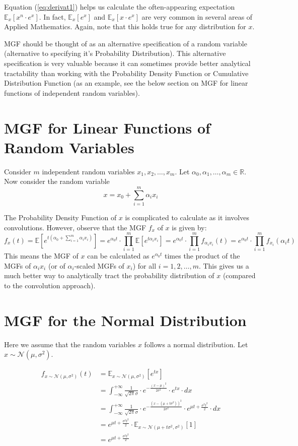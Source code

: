 \documentclass[10pt]{amsart}
\begin{document}
Equation (\ref{eq:derivat1}) helps us calculate the often-appearing expectation $\mathbb{E}_x[x^n \cdot e^x]$. In fact, $\mathbb{E}_x[e^x]$ and $\mathbb{E}_x[x \cdot e^x]$ are very common in several areas of Applied Mathematics. Again, note that this holds true for any distribution for $x$.

MGF should be thought of as an alternative specification of a random variable (alternative to specifying it's Probability Distribution). This alternative specification is very valuable because it can sometimes provide better analytical tractability than working with the Probability Density Function or Cumulative Distribution Function (as an example, see the below section on MGF for linear functions of independent random variables).

\section{MGF for Linear Functions of Random Variables}
Consider $m$ independent random variables $x_1, x_2, \ldots, x_m$. Let $\alpha_0, \alpha_1, \ldots, \alpha_m \in \mathbb{R}$. Now consider the random variable
$$x = x_0 + \sum_{i=1}^m \alpha_i x_i$$

The Probability Density Function of $x$ is complicated to calculate as it involves convolutions. However, observe that the MGF $f_x$ of $x$ is given by:
\begin{equation}
f_x(t) = \mathbb{E}[e^{t(\alpha_0 + \sum_{i=1}^m \alpha_i x_i)}] = e^{\alpha_0 t} \cdot \prod_{i=1}^m \mathbb{E}[e^{t\alpha_i x_i}] = e^{\alpha_0 t}  \cdot \prod_{i=1}^m f_{\alpha_i x_i}(t) = e^{\alpha_0 t}  \cdot \prod_{i=1}^m f_{x_i}(\alpha_i t)
\end{equation}
This means the MGF of $x$ can be calculated as $e^{\alpha_0 t}$ times the product of the MGFs of $\alpha_i x_i$ (or of $\alpha_i$-scaled MGFs of $x_i$) for all $i = 1, 2, \ldots, m$. This gives us a much better way to analytically tract the probability distribution of $x$ (compared to the convolution approach).


\section{MGF for the Normal Distribution}
Here we assume that the random variables $x$ follows a normal distribution. Let $x \sim \mathcal{N}(\mu, \sigma^2)$.

\begin{align}
f_{x\sim \mathcal{N}(\mu, \sigma^2)}(t) & = \mathbb{E}_{x\sim \mathcal{N}(\mu, \sigma^2)}[e^{tx}] \\
& = \int_{-\infty}^{+\infty} \frac {1} {\sqrt{2\pi} \sigma} \cdot e^{-\frac {(x - \mu)^2} {2\sigma^2}} \cdot e^{tx} \cdot dx \\
& = \int_{-\infty}^{+\infty} \frac {1} {\sqrt{2\pi} \sigma} \cdot e^{-\frac {(x-(\mu +t\sigma^2))^2} {2\sigma^2}} \cdot e^{\mu t + \frac {\sigma^2 t^2} {2}} \cdot dx \\
& = e^{\mu t + \frac {\sigma^2 t^2} 2} \cdot \mathbb{E}_{x\sim \mathcal{N}(\mu + t\sigma^2, \sigma^2)}[1] \\
& = e^{\mu t + \frac {\sigma^2 t^2} 2}
\end{align}
\end{document}
